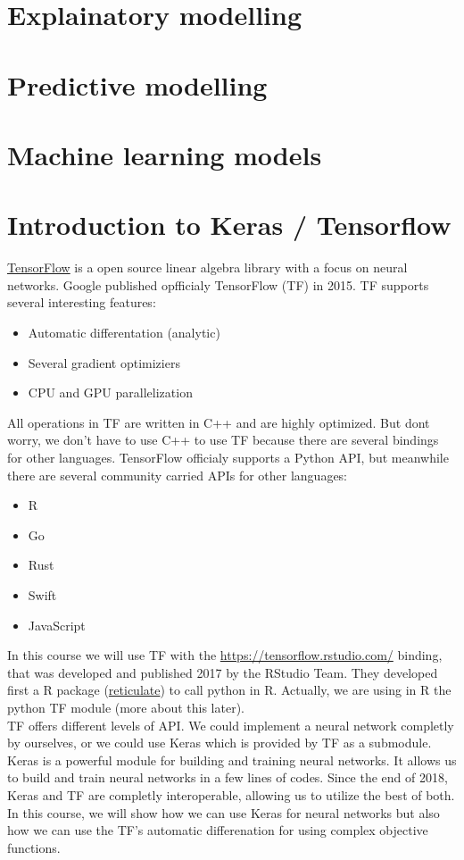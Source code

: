 \documentclass[a4paper,twoside]{tufte-book}\usepackage[]{graphicx}\usepackage[]{color}
\begin{document}
\section{Explainatory modelling}


\section{Predictive modelling}


\section{Machine learning models}


\section{Introduction to Keras / Tensorflow}

\href{https://www.tensorflow.org/}{TensorFlow} is a open source linear algebra library with a focus on neural networks. 
%
Google published opfficialy TensorFlow (TF) in 2015. 
%
TF supports several interesting features:
%
\begin{itemize}
\item Automatic differentation (analytic)
\item Several gradient optimiziers
\item CPU and GPU parallelization
\end{itemize}
%
All operations in TF are written in C++ and are highly optimized. 
%
But dont worry, we don't have to use C++ to use TF because there are several bindings for other languages.
%
TensorFlow officialy supports a Python API, but meanwhile there are several community carried APIs for other languages:
%
\begin{itemize}
\item R
\item Go
\item Rust
\item Swift
\item JavaScript
\end{itemize}
%
In this course we will use TF with the \href{R}{https://tensorflow.rstudio.com/} binding, that was developed and published 2017 by the RStudio Team.
%
They developed first a R package (\href{https://rstudio.github.io/reticulate/}{reticulate}) to call python in R. 
%
Actually, we are using in R the python TF module (more about this later). \\
%
TF offers different levels of API.
%
We could implement a neural network completly by ourselves, or we could use Keras which is provided by TF as a submodule.
%
Keras is a powerful module for building and training neural networks.
%
It allows us to build and train neural networks in a few lines of codes.
%
Since the end of 2018, Keras and TF are completly interoperable, allowing us to utilize the best of both.
%
In this course, we will show how we can use Keras for neural networks but also how we can use the TF's automatic differenation for using complex objective functions. 
%
\end{document}
